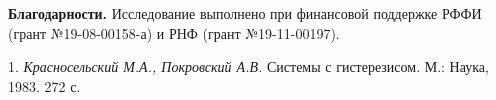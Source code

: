 \hspace{-1.3pt}\textbf{Благодарности.}\hspace{-1pt} Исследование выполнено при финансо\-вой поддержке РФФИ (грант №19-08-00158-а) и РНФ (грант №19-11-00197).

\litlist

1. {\it Красносельский М.А., Покровский А.В.} Системы с гистерезисом. М.: Наука, 1983. 272 с.
